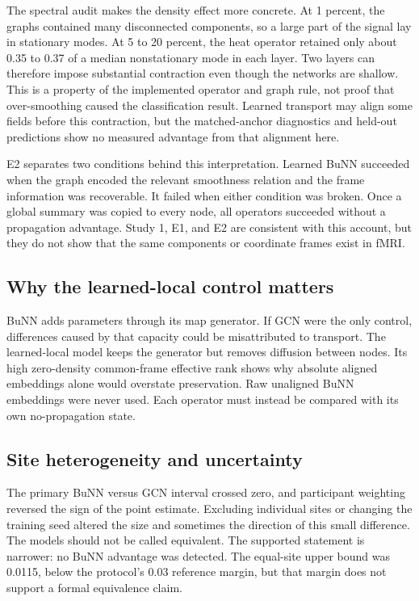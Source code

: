\documentclass[11pt,a4paper]{article}
\begin{document}
The spectral audit makes the density effect more concrete. At 1 percent, the
graphs contained many disconnected components, so a large part of the signal
lay in stationary modes. At 5 to 20 percent, the heat operator retained only
about 0.35 to 0.37 of a median nonstationary mode in each layer. Two layers can
therefore impose substantial contraction even though the networks are shallow.
This is a property of the implemented operator and graph rule, not proof that
over-smoothing caused the classification result. Learned transport may align
some fields before this contraction, but the matched-anchor diagnostics and
held-out predictions show no measured advantage from that alignment here.

E2 separates two conditions behind this interpretation. Learned BuNN succeeded
when the graph encoded the relevant smoothness relation and the frame
information was recoverable. It failed when either condition was broken. Once
a global summary was copied to every node, all operators succeeded without a
propagation advantage. Study 1, E1, and E2 are consistent with this account,
but they do not show that the same components or coordinate frames exist in
fMRI.

\subsection{Why the learned-local control matters}

BuNN adds parameters through its map generator. If GCN were the only control,
differences caused by that capacity could be misattributed to transport. The
learned-local model keeps the generator but removes diffusion between nodes.
Its high zero-density common-frame effective rank shows why absolute aligned
embeddings alone would overstate preservation. Raw unaligned BuNN embeddings
were never used. Each operator must instead be compared with its own
no-propagation state.

\subsection{Site heterogeneity and uncertainty}

The primary BuNN versus GCN interval crossed zero, and participant weighting
reversed the sign of the point estimate. Excluding individual sites or changing
the training seed altered the size and sometimes the direction of this small
difference. The models should not be called equivalent. The supported statement
is narrower: no BuNN advantage was detected. The equal-site upper bound was
0.0115, below the protocol's 0.03 reference margin, but that margin does not
support a formal equivalence claim.
\end{document}
